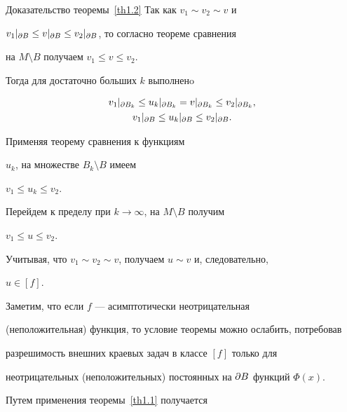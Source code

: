 \begin{pf*}{Доказательство теоремы~\ref{th1.2}}
Так как $v_1\sim v_2\sim v$ и


$v_1|_{\d{B}}\leq v|_{\d{B}}\leq


v_2|_{\d{B}}$, то согласно теореме сравнения 


на $M\setminus B$ получаем $v_1\leq v\leq v_2$.


Тогда для достаточно больших $k$ выполненo


\begin{gather*}


v_1|_{\d{B_k}}\leq u_k|_{\d{B_k}}=


v|_{\d{B_k}}\leq v_2|_{\d{B_k}}, \\


%


v_1|_{\d{B}}\leq u_k|_{\d{B}}\leq v_2|_{\d{B}}.


\end{gather*}


Применяя теорему сравнения к функциям


$u_k$, на множестве $B_k\setminus B$ имеем


$v_1\leq u_k\leq v_2$.


Перейдем к пределу при $k\to\infty$, на $M\setminus B$ получим


$v_1\leq u\leq v_2$.


Учитывая, что $v_1\sim v_2\sim v$, получаем $u\sim v$ и, следовательно,


$u\in[f]$.


\end{pf*}





Заметим, что если $f$ --- асимптотически неотрицательная


(неположительная) функция, то условие теоремы можно ослабить, потребовав


разрешимость внешних краевых задач в классе $[f]$ только для


неотрицательных (неположительных) постоянных на $\partial{B}$ функций $\Phi(x)$.





Путем применения теоремы~\ref{th1.1} получается








